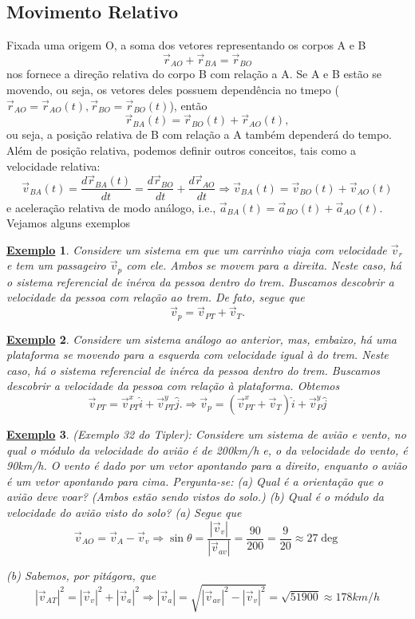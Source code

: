 \documentclass{article}
\newtheorem{example}{\underline{Exemplo}}
\begin{document}
\subsection{Movimento Relativo}
  Fixada uma origem O, a soma dos vetores representando os corpos A e B
    $$
      \vec{r}_{AO} + \vec{r}_{BA} = \vec{r}_{BO}
    $$
  nos fornece a dire\c c\~ao relativa do corpo B com rela\c c\~ao a A. Se A e B est\~ao se movendo, ou seja, os vetores deles 
possuem depend\^encia no tmepo ($\vec{r}_{AO} = \vec{r}_{AO}(t), \vec{r}_{BO} = \vec{r}_{BO}(t)$), ent\~ao 
  $$
    \vec{r}_{BA}(t) = \vec{r}_{BO}(t) + \vec{r}_{AO}(t),
  $$
  ou seja, a posi\c c\~ao relativa de B com rela\c c\~ao a A tamb\'em depender\'a do tempo. Al\'em de posi\c c\~ao relativa,
podemos definir outros conceitos, tais como a velocidade relativa: 
  $$
    \vec{v}_{BA}(t) = \frac{d \vec{r}_{BA}(t)}{dt} = \frac{d \vec{r}_{BO}}{dt} + \frac{d \vec{r}_{AO}}{dt} \Rightarrow \vec{v}_{BA}(t) = \vec{v}_{BO}(t)  + \vec{v}_{AO}(t)
  $$
  e acelera\c c\~ao relativa de modo an\'alogo, i.e., $\vec{a}_{BA}(t) = \vec{a}_{BO}(t) + \vec{a}_{AO}(t).$ Vejamos alguns exemplos
 \begin{example}
   Considere um sistema em que um carrinho viaja com velocidade $\vec{v}_{r}$ e tem um passageiro $\vec{v}_{p}$ com ele. 
Ambos se movem para a direita. 
  Neste caso, h\'a o sistema referencial de in\'erca da pessoa dentro do trem. Buscamos descobrir a velocidade da pessoa com rela\c c\~ao ao trem. 
De fato, segue que 
  $$
    \vec{v}_{p} = \vec{v}_{PT} + \vec{v}_{T}.
  $$
 \end{example}
 \begin{example}
  Considere um sistema an\'alogo ao anterior, mas, embaixo, h\'a uma plataforma se movendo para a esquerda com velocidade igual \`a do trem.
  Neste caso, h\'a o sistema referencial de in\'erca da pessoa dentro do trem. Buscamos descobrir a velocidade da pessoa com rela\c c\~ao
\`a plataforma. Obtemos
  $$
  \vec{v}_{PT} = \vec{v}_{PT}^{x}\hat{i} + \vec{v}_{PT}^{y}\hat{j}. \Rightarrow \vec{v}_{p} = (\vec{v}_{PT}^{x} + \vec{v}_{T})\hat{i} + \vec{v}_{P}^{y}\hat{j}
  $$
 \end{example}
\begin{example}
  (Exemplo 32 do Tipler): Considere um sistema de avi\~ao e vento, no qual o m\'odulo da velocidade do avi\~ao \'e de 200km/h e,
 o da velocidade do vento, \'e 90km/h. O vento \'e dado por um vetor apontando para a direito, enquanto o avi\~ao \'e um vetor apontando para cima. 
Pergunta-se: (a) Qual \'e a orienta\c c\~ao que o avi\~ao deve voar? (Ambos est\~ao sendo vistos do solo.) (b) Qual \'e o m\'odulo da
velocidade do avi\~ao visto do solo?
  (a) Segue que 
    $$
      \vec{v}_{AO} = \vec{v}_{A} - \vec{v}_{v} \Rightarrow \sin{\theta} = \frac{|\vec{v}_{v}|}{|\vec{v}_{av}|} = \frac{90}{200} = \frac{9}{20}\approx 27\deg
    $$

    (b) Sabemos, por pit\'agora, que 
      $$
      |\vec{v}_{AT}|^{2} = |\vec{v}_{v}|^{2} + |\vec{v}_{a}|^{2} \Rightarrow |\vec{v}_{a}| = \sqrt{|\vec{v}_{av}|^{2} - |\vec{v}_{v}|^{2}} = \sqrt{51900}\approx 178km/h
      $$
\end{example}
\end{document}
